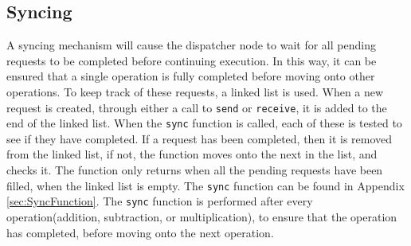 \subsection{Syncing}
A syncing mechanism will cause the dispatcher node to wait for all pending requests to be completed before continuing execution. In this way, it can be ensured that a single operation is fully completed before moving onto other operations. To keep track of these requests, a linked list is used. When a new request is created, through either a call to \verb|send| or \verb|receive|, it is added to the end of the linked list. When the \verb|sync| function is called, each of these is tested to see if they have completed. If a request has been completed, then it is removed from the linked list, if not, the function moves onto the next in the list, and checks it. The function only returns when all the pending requests have been filled, when the linked list is empty. The \verb|sync| function can be found in Appendix \ref{sec:SyncFunction}. The \verb|sync| function is performed after every operation(addition, subtraction, or multiplication), to ensure that the operation has completed, before moving onto the next operation.